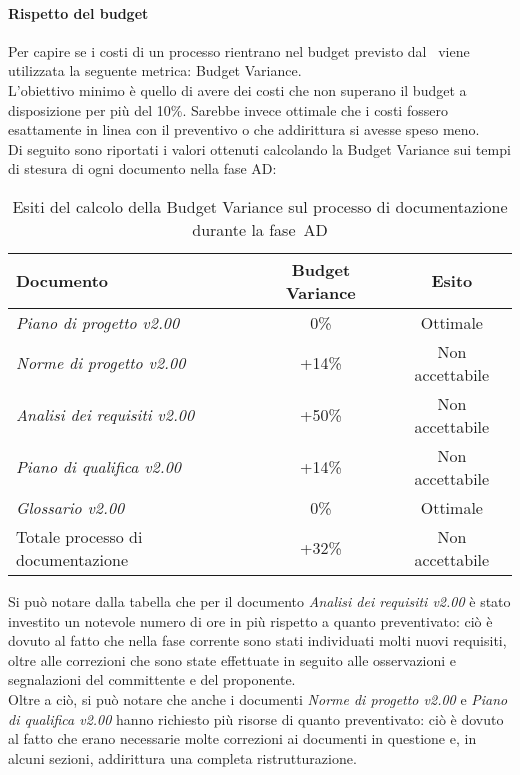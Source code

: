 \documentclass[../PianoDiQualifica.tex]{subfiles}
\begin{document}
\begin{appendices}
			\paragraph{Rispetto del budget}
			Per capire se i costi di un processo rientrano nel budget previsto dal \pianodiprogetto\ viene utilizzata la seguente metrica: Budget Variance.\\
			L'obiettivo minimo è quello di avere dei costi che non superano il budget a disposizione per più del 10\%. Sarebbe invece ottimale che i costi fossero esattamente in linea con il preventivo o che addirittura si avesse speso meno.\\
			Di seguito sono riportati i valori ottenuti calcolando la Budget Variance sui tempi di stesura di ogni documento nella fase AD:
			\begin{table}[H]
				\centering
				\begin{tabular}{l * {2}{c}}
					\toprule
					\textbf{Documento} & \textbf{Budget Variance} & \textbf{Esito} \\
					\midrule
					\textit{Piano di progetto v2.00} & 0\% &  Ottimale \\
					\textit{Norme di progetto v2.00} & +14\% & Non accettabile \\
					\textit{Analisi dei requisiti v2.00} & +50\% & Non accettabile \\
					\textit{Piano di qualifica v2.00} & +14\% & Non accettabile \\
					\textit{Glossario v2.00} & 0\% & Ottimale \\
					Totale processo di documentazione & +32\% & Non accettabile \\
					\bottomrule
				\end{tabular}
				\caption{Esiti del calcolo della Budget Variance sul processo di documentazione durante la fase\g\ AD}
				\label{tab:esiti_budget_variance}
			\end{table}
			Si può notare dalla tabella che per il documento \textit{Analisi dei requisiti v2.00} è stato investito un notevole numero di ore in più rispetto a quanto preventivato: ciò è dovuto al fatto che nella fase corrente sono stati individuati molti nuovi requisiti, oltre alle correzioni che sono state effettuate in seguito alle osservazioni e segnalazioni del committente e del proponente.\\
			Oltre a ciò, si può notare che anche i documenti \textit{Norme di progetto v2.00} e \textit{Piano di qualifica v2.00} hanno richiesto più risorse di quanto preventivato: ciò è dovuto al fatto che erano necessarie molte correzioni ai documenti in questione e, in alcuni sezioni, addirittura una completa ristrutturazione. 
						

\end{appendices}
\end{document}
